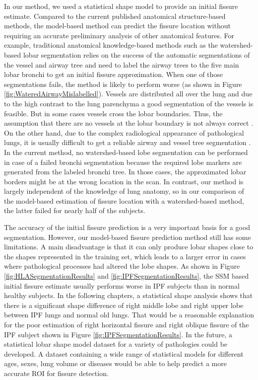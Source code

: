 {In our method, we used a statistical shape model to provide an initial fissure estimate. Compared to the current published anatomical structure-based methods, the model-based method can predict the fissure location without requiring an accurate preliminary analysis of other anatomical features. For example, traditional anatomical knowledge-based methods such as the watershed-based lobar segmentation relies on the success of the automatic segmentations of the vessel and airway tree and need to label the airway trees to the five main lobar bronchi to get an initial fissure approximation. When one of those segmentations fails, the method is likely to perform worse (as shown in Figure \ref{fig:WateredAirwayMislabelled}). Vessels are distributed all over the lung and due to the high contrast to the lung parenchyma a good segmentation of the vessels is feasible.  But in some cases vessels cross the lobar boundaries. Thus, the assumption that there are no vessels at the lobar boundary is not always correct \citep{pu2009pulmonary}. On the other hand, due to the complex radiological appearance of pathological lungs, it is usually difficult to get a reliable airway and vessel tree segmentation \citep{lassen2011interactive,lassen2013automatic}. In the current method, no watershed-based lobe segmentation can be performed in case of a failed bronchi segmentation because the required lobe markers are generated from the labeled bronchi tree. In those cases, the approximated lobar borders might be at the wrong location in the scan. In contrast, our method is largely independent of the knowledge of lung anatomy, so in our comparison of the model-based estimation of fissure location with a watershed-based method, the latter failed for nearly half of the subjects. 

The accuracy of the initial fissure prediction is a very important basis for a good segmentation. However, our model-based fissure prediction method still has some limitations.  A main disadvantage is that it can only produce lobar shapes close to the shapes represented in the training set, which leads to a larger error in cases where pathological processes had altered the lobe shapes. As shown in Figure \ref{fig:HLASegmentationResults} and \ref{fig:IPFSegmentationResults}, the SSM based initial fissure estimate usually performs worse in IPF subjects than in normal healthy subjects. In the following chapters, a statistical shape analysis shows that there is a significant shape difference of right middle lobe and right upper lobe between IPF lungs and normal old lungs. That would be a reasonable explanation for the poor estimation of right horizontal fissure and right oblique fissure of the IPF subject shown in Figure \ref{fig:IPFSegmentationResults}. In the future, a statistical lobar shape model dataset for a variety of pathologies could be developed. A dataset containing a wide range of statistical models for different ages, sexes, lung volume or diseases would be able to help predict a more accurate ROI for fissure detection.

}
